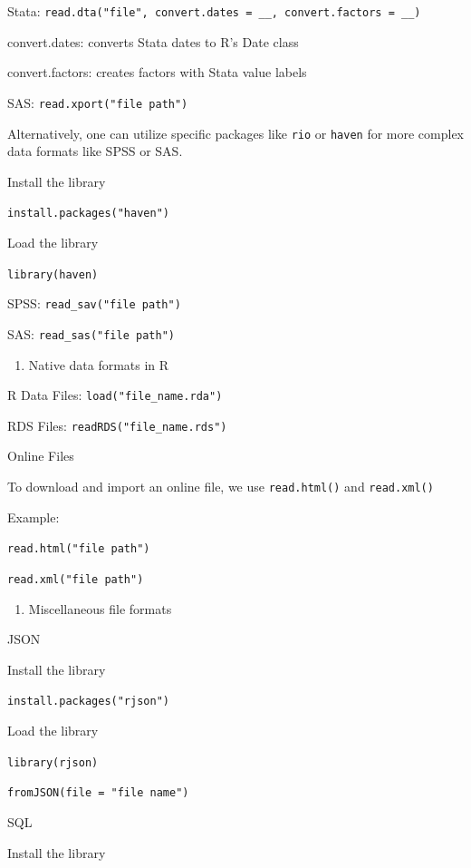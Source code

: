 \documentclass[
  letterpaper,
  DIV=11,
  numbers=noendperiod]{scrreprt}
\providecommand{\tightlist}{%
  \setlength{\itemsep}{0pt}\setlength{\parskip}{0pt}}\usepackage{longtable,booktabs,array}
\begin{document}
Stata:
\texttt{read.dta("file",\ convert.dates\ =\ \_\_,\ convert.factors\ =\ \_\_)}

convert.dates: converts Stata dates to R's Date class

convert.factors: creates factors with Stata value labels

SAS: \texttt{read.xport("file\ path")}

Alternatively, one can utilize specific packages like \texttt{rio} or
\texttt{haven} for more complex data formats like SPSS or SAS.

Install the library

\texttt{install.packages("haven")}

Load the library

\texttt{library(haven)}

SPSS: \texttt{read\_sav("file\ path")}

SAS: \texttt{read\_sas("file\ path")}

\begin{enumerate}
\def\labelenumi{\alph{enumi}.}
\setcounter{enumi}{2}
\tightlist
\item
  Native data formats in R
\end{enumerate}

R Data Files: \texttt{load("file\_name.rda")}

RDS Files: \texttt{readRDS("file\_name.rds")}

Online Files

To download and import an online file, we use \texttt{read.html()} and
\texttt{read.xml()}

Example:

\texttt{read.html("file\ path")}

\texttt{read.xml("file\ path")}

\begin{enumerate}
\def\labelenumi{\alph{enumi}.}
\setcounter{enumi}{4}
\tightlist
\item
  Miscellaneous file formats
\end{enumerate}

JSON

Install the library

\texttt{install.packages("rjson")}

Load the library

\texttt{library(rjson)}

\texttt{fromJSON(file\ =\ "file\ name")}

SQL

Install the library
\end{document}

